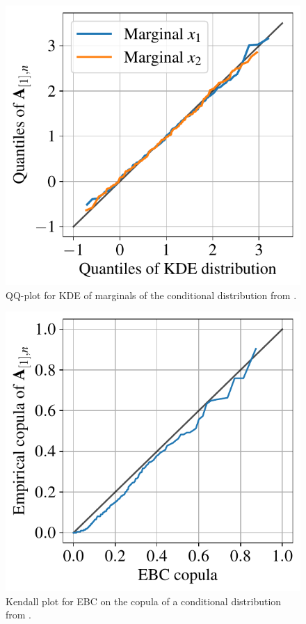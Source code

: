 \begin{figure}[!ht]
    \centering
    \includegraphics[width=0.6\linewidth]{part3/figures/BANCS/qqplots.pdf}
    \caption{QQ-plot for KDE of marginals of the conditional distribution from .}
    \label{fig:qqplot}
\end{figure}

\begin{figure}[!ht]
    \centering
    \includegraphics[width=0.6\linewidth]{part3/figures/BANCS/kendall_plot.pdf}
    \caption{Kendall plot for EBC on the copula of a conditional distribution from .}
    \label{fig:kendall_plot}
\end{figure}



